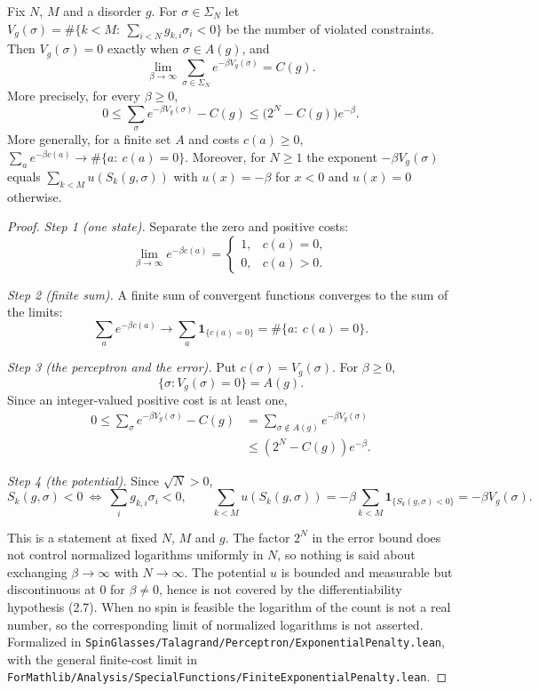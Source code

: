 \begin{theorem}\label{thm:sg-tal:perceptron-penalty}
  \leanok
{}
Fix $N$, $M$ and a disorder $g$. For $\sigma\in\Sigma_N$ let
$V_g(\sigma)=\#\{k<M:\ \sum_{i<N}g_{k,i}\sigma_i<0\}$ be the number of violated constraints. Then
$V_g(\sigma)=0$ exactly when $\sigma\in A(g)$, and
\[
\lim_{\beta\to\infty}\sum_{\sigma\in\Sigma_N}e^{-\beta V_g(\sigma)}=C(g).
\]
More precisely, for every $\beta\ge0$,
\[
0\le\sum_{\sigma}e^{-\beta V_g(\sigma)}-C(g)\le\bigl(2^N-C(g)\bigr)e^{-\beta}.
\]
More generally, for a finite set $A$ and costs $c(a)\ge0$, $\sum_{a}e^{-\beta c(a)}\to\#\{a:\ c(a)=0\}$.
Moreover, for $N\ge1$ the exponent $-\beta V_g(\sigma)$ equals $\sum_{k<M}u(S_k(g,\sigma))$ with
$u(x)=-\beta$ for $x<0$ and $u(x)=0$ otherwise.
\end{theorem}
\begin{proof}
  \leanok
\emph{Step 1 (one state).} Separate the zero and positive costs:
\[
 \lim_{\beta\to\infty}e^{-\beta c(a)}=
 \begin{cases}1,&c(a)=0,\\ 0,&c(a)>0.
 \end{cases}
\]

\emph{Step 2 (finite sum).} A finite sum of convergent functions converges to the sum of the limits:
\[
\sum_{a}e^{-\beta c(a)}\longrightarrow\sum_{a}\mathbf 1_{\{c(a)=0\}}=\#\{a:\ c(a)=0\}.
\]

\emph{Step 3 (the perceptron and the error).} Put $c(\sigma)=V_g(\sigma)$. For $\beta\ge0$,
\[
 \{\sigma:V_g(\sigma)=0\}=A(g).
\]
Since an integer-valued positive cost is at least one,
\begin{align*}
 0\le\sum_\sigma e^{-\beta V_g(\sigma)}-C(g)
 &=\sum_{\sigma\notin A(g)}e^{-\beta V_g(\sigma)}\\
 &\le(2^N-C(g))e^{-\beta}.
\end{align*}

\emph{Step 4 (the potential).} Since $\sqrt N>0$,
\[
 S_k(g,\sigma)<0\ \Longleftrightarrow\ \sum_i g_{k,i}\sigma_i<0,\qquad
 \sum_{k<M}u(S_k(g,\sigma))=-\beta\sum_{k<M}\mathbf1_{\{S_k(g,\sigma)<0\}}
 =-\beta V_g(\sigma).
\]

This is a statement at fixed $N$, $M$ and $g$. The factor $2^N$ in the error bound does not control normalized
logarithms uniformly in $N$, so nothing is said about exchanging $\beta\to\infty$ with $N\to\infty$.
The potential $u$ is bounded and measurable but discontinuous at $0$ for $\beta\ne0$, hence is not covered by the
differentiability hypothesis (2.7). When no spin is feasible the logarithm of the count is not a real number, so
the corresponding limit of normalized logarithms is not asserted.
Formalized in \texttt{SpinGlasses/Talagrand/Perceptron/ExponentialPenalty.lean}, with the general finite-cost
limit in \texttt{ForMathlib/Analysis/SpecialFunctions/FiniteExponentialPenalty.lean}.
\end{proof}

